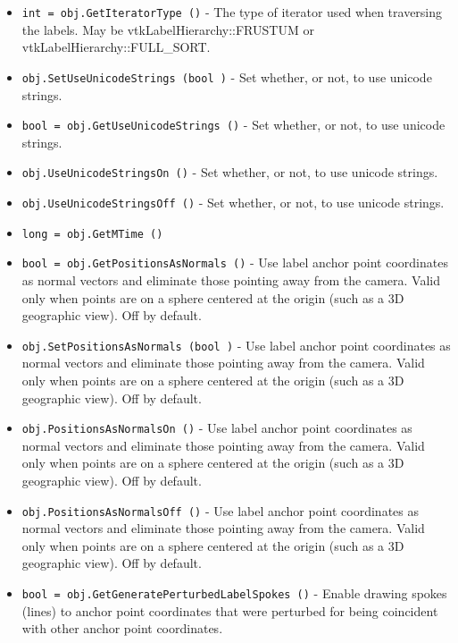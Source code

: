 \begin{itemize}
\item  \verb|int = obj.GetIteratorType ()| -  The type of iterator used when traversing the labels.
 May be vtkLabelHierarchy::FRUSTUM or vtkLabelHierarchy::FULL\_SORT.

\item  \verb|obj.SetUseUnicodeStrings (bool )| -  Set whether, or not, to use unicode strings.

\item  \verb|bool = obj.GetUseUnicodeStrings ()| -  Set whether, or not, to use unicode strings.

\item  \verb|obj.UseUnicodeStringsOn ()| -  Set whether, or not, to use unicode strings.

\item  \verb|obj.UseUnicodeStringsOff ()| -  Set whether, or not, to use unicode strings.

\item  \verb|long = obj.GetMTime ()|

\item  \verb|bool = obj.GetPositionsAsNormals ()| -  Use label anchor point coordinates as normal vectors and eliminate those
 pointing away from the camera. Valid only when points are on a sphere
 centered at the origin (such as a 3D geographic view). Off by default.

\item  \verb|obj.SetPositionsAsNormals (bool )| -  Use label anchor point coordinates as normal vectors and eliminate those
 pointing away from the camera. Valid only when points are on a sphere
 centered at the origin (such as a 3D geographic view). Off by default.

\item  \verb|obj.PositionsAsNormalsOn ()| -  Use label anchor point coordinates as normal vectors and eliminate those
 pointing away from the camera. Valid only when points are on a sphere
 centered at the origin (such as a 3D geographic view). Off by default.

\item  \verb|obj.PositionsAsNormalsOff ()| -  Use label anchor point coordinates as normal vectors and eliminate those
 pointing away from the camera. Valid only when points are on a sphere
 centered at the origin (such as a 3D geographic view). Off by default.

\item  \verb|bool = obj.GetGeneratePerturbedLabelSpokes ()| -  Enable drawing spokes (lines) to anchor point coordinates that were perturbed
 for being coincident with other anchor point coordinates.


\end{itemize}
